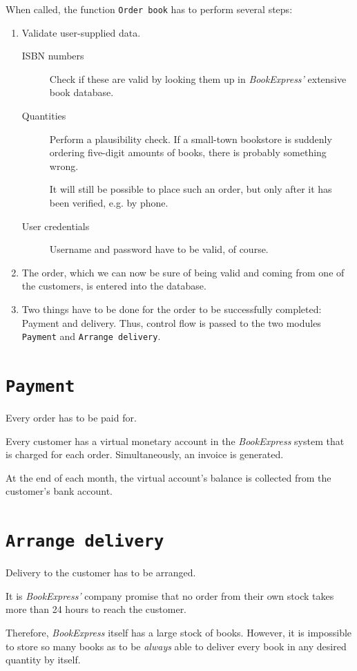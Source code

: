 When called, the function \texttt{Order book} has to perform several steps:
\begin{enumerate}
	\item Validate user-supplied data.

		  \begin{description}
		  	\item[ISBN numbers] Check if these are valid by looking them up in \emph{BookExpress'} extensive book database.
			\item[Quantities]   Perform a plausibility check. If a small-town bookstore is suddenly ordering five-digit amounts of books,
			                    there is probably something wrong.

								It will still be possible to place such an order, but only after it has been verified, e.g. by phone.
			\item[User credentials] Username and password have to be valid, of course.
		  \end{description}
   \item The order, which we can now be sure of being valid and coming from one of the customers, is entered into the database.
   \item Two things have to be done for the order to be successfully completed: Payment and delivery. Thus, control flow is passed to the
         two modules \texttt{Payment} and \texttt{Arrange delivery}.
\end{enumerate}

\section{\texttt{Payment}}
Every order has to be paid for.

Every customer has a virtual monetary account in the \emph{BookExpress} system that is charged for each order. Simultaneously, an invoice
is generated.

At the end of each month, the virtual account's balance is collected from the customer's bank account.


\section{\texttt{Arrange delivery}}
Delivery to the customer has to be arranged.

It is \emph{BookExpress'} company promise that no order from their own stock takes more than 24 hours to reach the customer.

Therefore, \emph{BookExpress} itself has a large stock of books. However, it is impossible to store so many books as to be \emph{always}
able to deliver every book in any desired quantity by itself.

